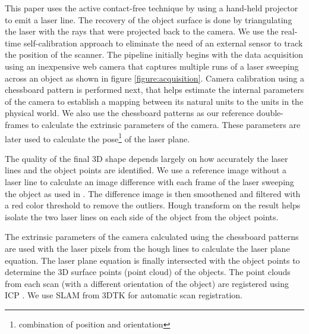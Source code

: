 This paper uses the active contact-free technique by using a hand-held
projector to emit a laser line. The recovery of the object surface is done by
triangulating the laser with the rays that were projected back to the camera.
We use the real-time self-calibration approach \cite{winkelbach:2006} to
eliminate the need of an external sensor to track the position of the scanner.
The pipeline initially begins with the data acquisition using an inexpensive
web camera that captures multiple runs of a laser sweeping across an object as
shown in figure \ref{figure:acquisition}. Camera calibration using a
chessboard pattern is performed next, that helps estimate the internal
parameters of the camera to establish a mapping between its natural units to
the units in the physical world. We also use the chessboard patterns as our
reference double-frames to calculate the extrinsic parameters of the camera.
These parameters are later used to calculate the pose\footnote{combination of
position and orientation} of the laser plane.

The quality of the final 3D shape depends largely on how accurately the laser
lines and the object points are identified. We use a reference image without a
laser line to calculate an image difference with each frame of the laser
sweeping the object as used in \cite{winkelbach:2006}. The difference image is
then smoothened and filtered with a red color threshold to remove the
outliers. Hough transform on the result helps isolate the two laser lines on
each side of the object from the object points.

The extrinsic parameters of the camera calculated using the chessboard
patterns are used with the laser pixels from the hough lines to calculate the
laser plane equation. The laser plane equation is finally intersected with the
object points to determine the 3D surface points (point cloud) of the objects.
The point clouds from each scan (with a different orientation of the object)
are registered using \ac{ICP} \cite{besl:1992}. We use \ac{SLAM} from
\ac{3DTK} \cite{3dtk:2012} for automatic scan registration.

